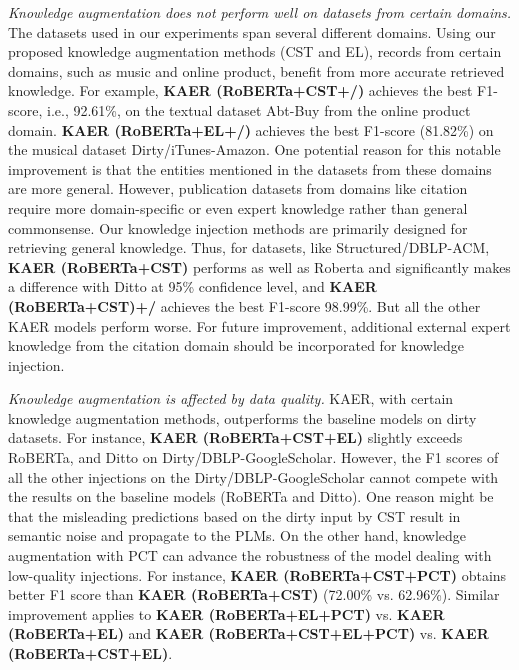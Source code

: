 \textit{Knowledge augmentation does not perform well on datasets from certain domains.}
The datasets used in our experiments span several different domains. Using our proposed knowledge augmentation methods (CST and EL), records from certain domains, such as music and online product, benefit from more accurate retrieved knowledge.
For example, \textbf{KAER (RoBERTa+CST+/)} achieves the best F1-score, i.e., 92.61\%, on the textual dataset Abt-Buy from the online product domain.
\textbf{KAER (RoBERTa+EL+/)} achieves the best F1-score (81.82\%) on the musical dataset Dirty/iTunes-Amazon. %
One potential reason for this notable improvement is that the entities mentioned in the datasets from these domains are more general.
However, publication datasets from domains like citation require more domain-specific or even expert knowledge rather than general commonsense. Our knowledge injection methods are primarily designed for retrieving general knowledge.
Thus, for datasets, like Structured/DBLP-ACM, \textbf{KAER (RoBERTa+CST)} performs as well as Roberta and significantly makes a difference with Ditto at 95\% confidence level, and \textbf{KAER (RoBERTa+CST)+/}  achieves the best F1-score 98.99\%. But all the other KAER models perform worse. For future improvement, additional external expert knowledge from the citation domain should be incorporated for knowledge injection. 

\textit{Knowledge augmentation is affected by data quality.}
KAER, with certain knowledge augmentation methods, outperforms the baseline models on dirty datasets. For instance, \textbf{KAER (RoBERTa+CST+EL)} slightly exceeds RoBERTa, and Ditto on Dirty/DBLP-GoogleScholar.
However, the F1 scores of all the other injections on the Dirty/DBLP-GoogleScholar cannot compete with the results on the baseline models (RoBERTa and Ditto). One reason might be that the misleading predictions based on the dirty input by CST result in semantic noise and propagate to the PLMs.
On the other hand, knowledge augmentation with PCT can advance the robustness of the model dealing with low-quality injections. For instance, \textbf{KAER (RoBERTa+CST+PCT)} obtains better F1 score than \textbf{KAER (RoBERTa+CST)} (72.00\% vs. 62.96\%). 
Similar improvement applies to \textbf{KAER (RoBERTa+EL+PCT)} vs. \textbf{KAER (RoBERTa+EL)} %
and  \textbf{KAER (RoBERTa+CST+EL+PCT)} vs. \textbf{KAER (RoBERTa+CST+EL)}. %

